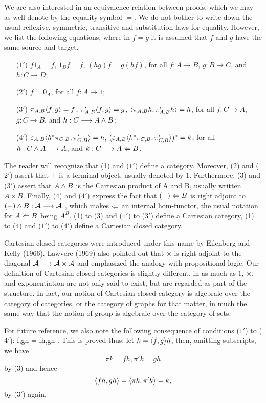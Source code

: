 We are also interested in an equivalence relation between proofs,
which we may as well denote by the equality symbol $=$. We do not bother to
write down the usual reflexive, symmetric, transitive and substitution laws for
equality. However, we list the following equations, where in $f = g$ it is
assumed that $f$ and $g$ have the same source and target.
\begin{enumerate}[align=left]
\item[($1'$)]$f1_A = f$, $1_Bf = f$, $(hg)f = g(hf)$,
 for all $f:A \to B$, $g:B \to C$, and $h: C\to D$;
\item[($2'$)] $f= 0_A$, for all $f: A \to 1$;
\item[($3'$)] $\pi_{A,B}\langle f,g \rangle = f$, $\pi'_{A,B}\langle f,g \rangle = g$,
$\langle\pi_{A,B} h, \pi'_{A,B} h\rangle = h$, for all $f:C \to A$, $g:C \to B$, and $h: C\longrightarrow A\wedge B$;
\item[($4'$)] $\varepsilon_{A,B}\langle h^*\pi_{C,B}, \pi'_{C,B}\rangle = h$,
$(\varepsilon_{A,B}\langle k^*\pi_{C,B}, \pi'_{C,B}\rangle)^* = k$,
for all $h: C\wedge A \longrightarrow A$, and $k: C \longrightarrow A \Leftarrow B$.
\end{enumerate}
The reader will recognize that (1) and ($1'$) define a category.
Moreover, (2) and ($2'$) assert that $\top$
is a terminal object, usually denoted by $1$.
Furthermore, (3) and ($3'$) assert that $A \wedge B$ is the Cartesian product
of A and B, usually written $A \times B$.
Finally, (4) and ($4'$) express the fact that $(-) \Leftarrow B$ is right adjoint to
$(-) \wedge B: {\cal A} \longrightarrow {\cal A}$ , which makes $\Leftarrow$ an internal hom-functor, the
usual notation for $A \Leftarrow B$ being $A^B$.
(1) to (3) and ($1'$) to ($3'$) define a Cartesian category,
(1) to (4) and ($1'$) to ($4'$) define a Cartesian closed category.

Cartesian closed categories were introduced under this name
by Eilenberg and Kelly (1966). Lawvere (1969) also pointed out that $\times$
is right adjoint to the diagonal ${\cal A} \longrightarrow {\cal A} \times {\cal A}$ and emphasized the analogy
with propositional logic. Our definition of Cartesian closed categories is slightly different,
in as much as $1$, $\times$, and exponentiation are not only said to exist, but are regarded
as part of the structure. In fact, our notion of Cartesian closed category is algebraic over
the category of categories, or the category of graphs for that matter, in much the same way
that the notion of group is algebraic over the category of sets.

For future reference, we also note the following consequence of conditions ($1'$) to ($4'$):
\bes
\la f,g\ra h = \la fh,gh \ra .
\ees
This is proved thus: let $k = \langle f,g\rangle h$, then, omitting subscripts, we have
$$
\pi k=fh, \pi' k=gh
$$
by (3) and hence
$$
\langle fh,gh \rangle = \langle \pi k,\pi' k\rangle = k,
$$
by ($3'$) again.

